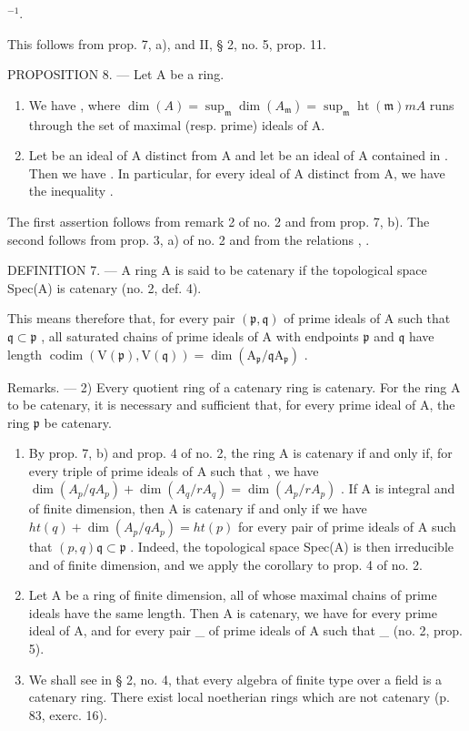 \(^{-1}\).

This follows from prop. 7, a), and II, § 2, no. 5, prop. 11.

PROPOSITION 8. --- Let A be a ring.

\begin{enumerate}
\def\labelenumi{\alph{enumi})}
\item
  We have  , where \(\dim(A) = \sup_{\mathfrak{m}} \dim(A_{\mathfrak{m}}) = \sup_{\mathfrak{m}} \operatorname{ht}(\mathfrak{m})\)\(m\)\(A\) runs through the set of maximal (resp. prime) ideals of A.
\item
  Let  be an ideal of A distinct from A and let  be an ideal of A contained in . Then we have  . In particular, for every ideal  of A distinct from A, we have the inequality .
\end{enumerate}

The first assertion follows from remark 2 of no. 2 and from prop. 7, b). The second follows from prop. 3, a) of no. 2 and from the relations , .

DEFINITION 7. --- A ring A is said to be catenary if the topological space Spec(A) is catenary (no. 2, def. 4).

This means therefore that, for every pair \((\mathfrak{p}, \mathfrak{q})\) of prime ideals of A such that \(\mathfrak{q} \subset \mathfrak{p}\) , all saturated chains of prime ideals of A with endpoints \(\mathfrak{p}\) and \(\mathfrak{q}\) have length \(\operatorname{codim}(\mathrm{V}(\mathfrak{p}), \mathrm{V}(\mathfrak{q})) = \dim(\mathrm{A}_{\mathfrak{p}} / \mathfrak{q}\mathrm{A}_{\mathfrak{p}})\) .

Remarks. --- 2) Every quotient ring of a catenary ring is catenary. For the ring A to be catenary, it is necessary and sufficient that, for every prime ideal  of A, the ring \(\mathfrak{p}\) be catenary.

\begin{enumerate}
\def\labelenumi{\arabic{enumi})}
\setcounter{enumi}{2}
\item
  By prop. 7, b) and prop. 4 of no. 2, the ring A is catenary if and only if, for every triple  of prime ideals of A such that , we have \(\dim(A_{p}/qA_{p}) + \dim(A_{q}/rA_{q}) = \dim(A_{p}/rA_{p})\) . If A is integral and of finite dimension, then A is catenary if and only if we have \(ht(q) + \dim(A_{p}/qA_{p}) = ht(p)\) for every pair  of prime ideals of A such that \((p, q)\)\(\mathfrak{q} \subset \mathfrak{p}\) . Indeed, the topological space Spec(A) is then irreducible and of finite dimension, and we apply the corollary to prop. 4 of no. 2.
\item
  Let A be a ring of finite dimension, all of whose maximal chains of prime ideals have the same length. Then A is catenary, we have  for every prime ideal  of A, and  for every pair \_ of prime ideals of A such that \_ (no. 2, prop. 5).
\item
  We shall see in § 2, no. 4, that every algebra of finite type over a field is a catenary ring. There exist local noetherian rings which are not catenary (p. 83, exerc. 16).
\end{enumerate}

